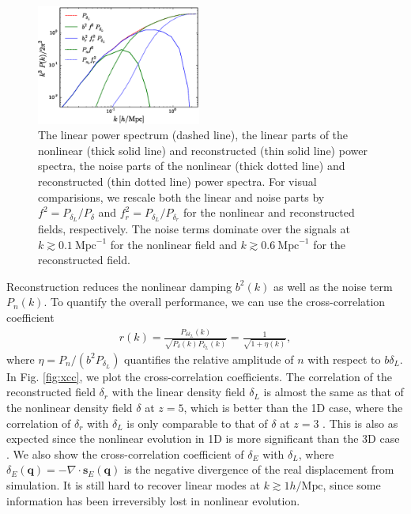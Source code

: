 \documentclass[aps,prd,twocolumn,superscriptaddress,groupedaddress,nofootinbib]{revtex4}  %
\newcommand{\mr}{\mathrm}
\newcommand{\bea}{\begin{eqnarray}}
\newcommand{\eea}{\end{eqnarray}}
\begin{document}
\begin{figure}[tbp]
\begin{center}
\includegraphics[width=0.48\textwidth]{fb.eps}
\end{center}
\vspace{-0.7cm}
\caption{The linear power spectrum (dashed line), the linear parts of the
nonlinear (thick solid line) and reconstructed (thin solid line) power spectra,
the noise parts of the nonlinear (thick dotted line) and reconstructed
(thin dotted line) power spectra.
For visual comparisions, we rescale both the linear and noise parts by
$f^2=P_{\delta_L}/P_{\delta}$ and $f^2_r=P_{\delta_L}/P_{\delta_r}$ for the nonlinear and reconstructed fields, respectively.
The noise terms dominate over the signals at
$k\gtrsim0.1\ \mr{Mpc}^{-1}$ for the nonlinear field and $k\gtrsim0.6\ \mr{Mpc}^{-1}$
for the reconstructed field.}
\label{fig:ps}
\end{figure}

Reconstruction reduces the nonlinear damping $b^2(k)$ as well as the
noise term $P_{n}(k)$. To quantify the overall performance, we can use the
cross-correlation coefficient
\bea
r(k)=\frac{P_{\delta\delta_L}(k)}
{\sqrt{P_{\delta}(k)P_{\delta_L}(k)}}
=\frac{1}{\sqrt{1+\eta(k)}},
\eea
where $\eta=P_n/(b^2P_{\delta_L})$ quantifies the relative amplitude
of $n$ with respect to $b\delta_L$. 
In Fig. \ref{fig:xcc}, we plot the cross-correlation coefficients.
The correlation of the reconstructed field $\delta_r$ with the linear density
field $\delta_L$ is almost the same as that of the nonlinear density field 
$\delta$ at $z=5$, which is better than the 1D case, where the correlation of
$\delta_r$ with $\delta_L$ is only comparable to that of $\delta$ 
at $z=3$ \cite{2016arXiv160907041Z}.
This is also as expected since the nonlinear evolution in 1D is more
significant than the 3D case \cite{2016matt}.
We also show the cross-correlation coefficient of $\delta_E$ with $\delta_L$,
where $\delta_E(\bm{q})=-\nabla\cdot \bm{s}_E(\bm{q})$ is the negative 
divergence of the real displacement from simulation.
It is still hard to recover linear modes at $k\gtrsim1h/\mr{Mpc}$, since some information has been irreversibly lost in nonlinear evolution. 
\end{document}
